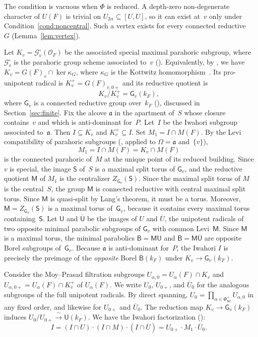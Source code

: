 \documentclass[11pt]{amsart}
\theoremstyle{definition}
\theoremstyle{remark}
\newcommand{\OO}{\mathcal{O}}
\newcommand{\barr}[1]{\overline{#1}}
\begin{document}
The condition is vacuous when $\Phi$ is reduced. A depth-zero non-degenerate character of $U(F)$ is trivial on $U_{2\alpha}\subseteq[U,U]$, so it can exist at~$v$ only under Condition~\ref{cond:noncentral}. Such a vertex exists for every connected reductive~$G$ (Lemma~\ref{lem:vertex}).

Let $K_v = \mathcal{G}_v^\circ(\OO_F)$ be the associated special maximal parahoric subgroup, where $\mathcal{G}_v^\circ$ is the parahoric group scheme associated to~$v$ (\cite[\S8]{KP}). Equivalently, by \cite[Def.~1, Prop.~3]{HRpar}, we have $K_v = G(F)_v\cap\ker\kappa_G$, where $\kappa_G$ is the Kottwitz homomorphism~\cite{Kottwitz}. Its pro-unipotent radical is $K_v^+ = G(F)_{v,0+}$ and its reductive quotient is
\[
K_v/K_v^+ = \mathsf{G}_v(k_{F}), 
\]
where $\mathsf{G}_v$ is a connected reductive group over~$k_F$ (\cite[\S 13.2.6]{KP}), discussed in Section~\ref{sec:finite}. Fix the alcove $\mathfrak{a}$ in the apartment of~$S$ whose closure contains~$v$ and which is anti-dominant for~$P$. Let~$I$ be the Iwahori subgroup associated to~$\mathfrak{a}$. Then $I \subseteq K_v$ and $K_v^+ \subseteq I$. Set $M_1 = I\cap M(F)$. By the Levi compatibility of parahoric subgroups (\cite[Cor.~9.7.3]{KP}, applied to $\Omega = \mathfrak a$ and~$\{v\}$),
\[
M_1 = I\cap M(F) = K_v\cap M(F)
\]
is the connected parahoric of~$M$ at the unique point of its reduced building.  Since $v$ is special, the image $\mathsf{S}$ of~$S$ is a maximal split torus of $\mathsf{G}_v$, and the reductive quotient $\mathsf{M}$ of $M_1$ is the centralizer
$Z_{\mathsf{G}_v}(\mathsf{S})$.   Since the maximal split torus of $M$ is the central~$S$, the group $\mathsf{M}$ is connected reductive with central maximal split torus. Since $\mathsf{M}$ is quasi-split by Lang's theorem, it must be a torus. Moreover, $\mathsf{M} = Z_{\mathsf{G}_v}(\mathsf{S})$ is a maximal torus of~$\mathsf{G}_v$, because it contains every maximal torus containing~$\mathsf{S}$. Let $\mathsf{U}$ and $\barr{\mathsf{U}}$ be the images of $U$ and $\barr{U}$, the unipotent radicals of two opposite minimal parabolic subgroups of $\mathsf{G}_v$ with common Levi~$\mathsf{M}$. Since $\mathsf{M}$ is a maximal torus, the minimal parabolics $\mathsf{B} = \mathsf{M}\mathsf{U}$ and $\barr{\mathsf{B}} = \mathsf{M}\barr{\mathsf{U}}$ are opposite Borel subgroups of~$\mathsf{G}_v$. Because $\mathfrak{a}$ is anti-dominant for~$P$, the Iwahori $I$ is precisely the preimage of the \emph{opposite} Borel $\barr{\mathsf{B}}(k_F)$ under $K_v \to \mathsf{G}_v(k_F)$.

Consider the Moy--Prasad filtration subgroups $U_{\alpha,0} = U_\alpha(F)\cap K_v$ and $U_{\alpha,0+} = U_\alpha(F)\cap K_v^+$ of $U_\alpha(F)$. We write $U_0$, $U_{0+}$, and $\barr{U}_0$ for the analogous subgroups of the full unipotent radicals. By direct spanning, $U_0 = \prod_{\alpha\in\Phi^+_{\mathrm{nd}}} U_{\alpha,0}$ in any fixed order, and likewise for $U_{0+}$ and $\barr{U}_0$. The reduction map $K_v \to \mathsf{G}_v(k_F)$ induces $U_0/U_{0+} \xrightarrow{\ \sim\ } \mathsf{U}(k_F)$. We have the Iwahori factorization (\cite[Cor.~7.4.9]{KP}):
\begin{equation}\label{eq:iwahori}
I = (I\cap U)\cdot(I\cap M)\cdot(I\cap\barr{U}) = U_{0+}\cdot M_1\cdot\barr{U}_{0}.
\end{equation}
\end{document}
